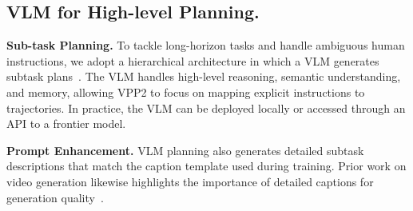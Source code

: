 
\subsection{VLM for High-level Planning.}
\textbf{Sub-task Planning.} To tackle long-horizon tasks and handle ambiguous human instructions, we adopt a hierarchical architecture in which a VLM generates subtask plans~\citep{shi2025hi}. The VLM handles high-level reasoning, semantic understanding, and memory, allowing VPP2 to focus on mapping explicit instructions to trajectories. In practice, the VLM can be deployed locally or accessed through an API to a frontier model.

\textbf{Prompt Enhancement.}
VLM planning also generates detailed subtask descriptions that match the caption template used during training. Prior work on video generation likewise highlights the importance of detailed captions for generation quality~\citep{wan2025wan,yang2025cogvideox}.






